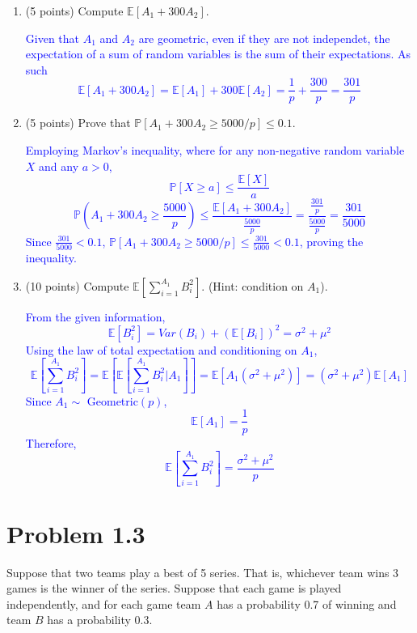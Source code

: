 \documentclass{article}
\begin{document}
\begin{enumerate}[label=(\alph*)]
    \item (5 points) Compute $\mathbb{E}[A_1 + 300A_2]$.

    \textcolor{blue}{Given that $A_1$ and $A_2$ are geometric, even if they are not independet, the expectation of a sum of random variables is the sum of their expectations. As such
    $$\mathbb{E}[A_1 + 300A_2]=\mathbb{E}[A_1] + 300\mathbb{E}[A_2]=\frac{1}{p}+\frac{300}{p}=\frac{301}{p}$$}

    \item (5 points) Prove that $\mathbb{P}[A_1 + 300A_2 \geq 5000/p] \leq 0.1$.

        \textcolor{blue}{Employing Markov's inequality, where for any non-negative random variable $X$ and any $a>0$, $$\mathbb{P}[X \geq a] \leq \frac{\mathbb{E}[X]}{a}$$
        $$\mathbb{P}\left( A_1 + 300A_2 \geq \frac{5000}{p} \right) \leq \frac{\mathbb{E}[A_1 + 300A_2]}{\frac{5000}{p}}=\frac{\frac{301}{p}}{\frac{5000}{p}}=\frac{301}{5000}$$
    Since $\frac{301}{5000} < 0.1$, $\mathbb{P}[A_1 + 300A_2 \geq 5000/p] \leq \frac{301}{5000} < 0.1$, proving the inequality.}


    \item (10 points) Compute $\mathbb{E}[\sum_{i=1}^{A_1} B_i^2]$. (Hint: condition on $A_1$).

        \textcolor{blue}{From the given information, $$\mathbb{E}[B^2_i]=Var(B_i)+(\mathbb{E}[B_i])^2 = \sigma^2 + \mu^2$$
        Using the law of total expectation and conditioning on $A_1$, $$\mathbb{E}[\sum_{i=1}^{A_1} B_i^2]=\mathbb{E}[\mathbb{E}[\sum_{i=1}^{A_1} B_i^2|A_1]]=\mathbb{E}[A_1(\sigma^2 + \mu^2)]=(\sigma^2 + \mu^2)\mathbb{E}[A_1]$$
        Since $A_1 \sim $ Geometric$(p)$, $$\mathbb{E}[A_1]=\frac{1}{p}$$  
        Therefore, $$\mathbb{E}\left[ \sum_{i=1}^{A_1}B^2_i \right] = \frac{\sigma^2 + \mu^2}{p}$$}

\end{enumerate}

\section*{Problem 1.3}
Suppose that two teams play a best of 5 series. That is, whichever team wins 3 games is the winner of the series. Suppose that each game is played independently, and for each game team $A$ has a probability 0.7 of winning and team $B$ has a probability 0.3.
\end{document}

